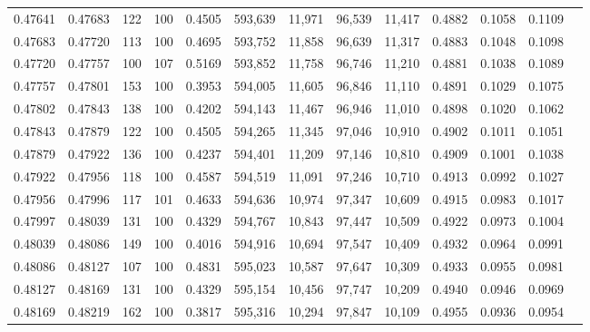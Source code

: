\begin{tabular}{rrrrrrrrrrrrr}
0.47641 & 0.47683 &   122 & 100 &                                     0.4505 & 593,639 &  11,971 &  96,539 &  11,417 & 0.4882 & 0.1058 & 0.1109 \\
0.47683 & 0.47720 &   113 & 100 &                                     0.4695 & 593,752 &  11,858 &  96,639 &  11,317 & 0.4883 & 0.1048 & 0.1098 \\
0.47720 & 0.47757 &   100 & 107 &                                     0.5169 & 593,852 &  11,758 &  96,746 &  11,210 & 0.4881 & 0.1038 & 0.1089 \\
0.47757 & 0.47801 &   153 & 100 &                                     0.3953 & 594,005 &  11,605 &  96,846 &  11,110 & 0.4891 & 0.1029 & 0.1075 \\
0.47802 & 0.47843 &   138 & 100 &                                     0.4202 & 594,143 &  11,467 &  96,946 &  11,010 & 0.4898 & 0.1020 & 0.1062 \\
0.47843 & 0.47879 &   122 & 100 &                                     0.4505 & 594,265 &  11,345 &  97,046 &  10,910 & 0.4902 & 0.1011 & 0.1051 \\
0.47879 & 0.47922 &   136 & 100 &                                     0.4237 & 594,401 &  11,209 &  97,146 &  10,810 & 0.4909 & 0.1001 & 0.1038 \\
0.47922 & 0.47956 &   118 & 100 &                                     0.4587 & 594,519 &  11,091 &  97,246 &  10,710 & 0.4913 & 0.0992 & 0.1027 \\
0.47956 & 0.47996 &   117 & 101 &                                     0.4633 & 594,636 &  10,974 &  97,347 &  10,609 & 0.4915 & 0.0983 & 0.1017 \\
0.47997 & 0.48039 &   131 & 100 &                                     0.4329 & 594,767 &  10,843 &  97,447 &  10,509 & 0.4922 & 0.0973 & 0.1004 \\
0.48039 & 0.48086 &   149 & 100 &                                     0.4016 & 594,916 &  10,694 &  97,547 &  10,409 & 0.4932 & 0.0964 & 0.0991 \\
0.48086 & 0.48127 &   107 & 100 &                                     0.4831 & 595,023 &  10,587 &  97,647 &  10,309 & 0.4933 & 0.0955 & 0.0981 \\
0.48127 & 0.48169 &   131 & 100 &                                     0.4329 & 595,154 &  10,456 &  97,747 &  10,209 & 0.4940 & 0.0946 & 0.0969 \\
0.48169 & 0.48219 &   162 & 100 &                                     0.3817 & 595,316 &  10,294 &  97,847 &  10,109 & 0.4955 & 0.0936 & 0.0954 \\

\end{tabular}
